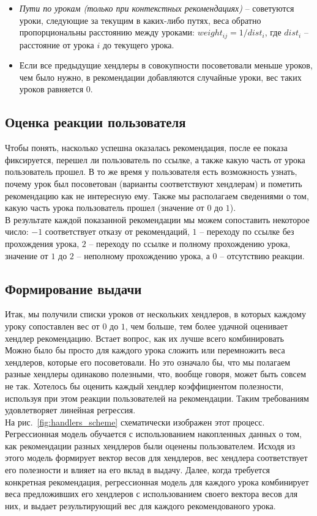 \documentclass[12pt]{article}
\begin{document}
\begin{itemize}
    \item \textit{Пути по урокам (только при контекстных рекомендациях)} -- советуются уроки, следующие за текущим в каких-либо путях, веса обратно пропорциональны расстоянию между уроками: $weight_{ij} = 1 / dist_{i}$, где $dist_i$ -- расстояние от урока $i$ до текущего урока.
    \item Если все предыдущие хендлеры в совокупности посоветовали меньше уроков, чем было нужно, в рекомендации добавляются случайные уроки, вес таких уроков равняется $0$.
\end{itemize}


\subsection{Оценка реакции пользователя}
\indent Чтобы понять, насколько успешна оказалась рекомендация, после ее показа фиксируется, перешел ли пользователь по ссылке, а также какую часть от урока пользователь прошел. В то же время у пользователя есть возможность узнать, почему урок был посоветован (варианты соответствуют хендлерам) и пометить рекомендацию как не интересную ему. Также мы располагаем сведениями о том, какую часть урока пользователь прошел (значение от $0$ до $1$).
\\\indent В результате каждой показанной рекомендации мы можем сопоставить некоторое число: $-1$ соответствует отказу от рекомендаций, $1$ -- переходу по ссылке без прохождения урока, $2$ -- переходу по ссылке и полному прохождению урока, значение от $1$ до $2$ -- неполному прохождению урока, а $0$ -- отсутствию реакции.


\subsection{Формирование выдачи}
\indent Итак, мы получили списки уроков от нескольких хендлеров, в которых каждому уроку сопоставлен вес от $0$ до $1$, чем больше, тем более удачной оценивает хендлер рекомендацию. Встает вопрос, как их лучше всего комбинировать
\\\indent Можно было бы просто для каждого урока сложить или перемножить веса хендлеров, которые его посоветовали. Но это означало бы, что мы полагаем разные хендлеры одинаково полезными, что, вообще говоря, может быть совсем не так. Хотелось бы оценить каждый хендлер коэффициентом полезности, используя при этом реакции пользователей на рекомендации. Таким требованиям удовлетворяет линейная регрессия.
\\\indent На рис.~\ref{fig:handlers_scheme} схематически изображен этот процесс. Регрессионная модель обучается с использованием накопленных данных о том, как рекомендации разных хендлеров были оценены пользователем. Исходя из этого модель формирует вектор весов для хендлеров, вес хендлера соответствует его полезности и влияет на его вклад в выдачу. Далее, когда требуется конкретная рекомендация, регрессионная модель для каждого урока комбинирует веса предложивших его хендлеров с использованием своего вектора весов для них, и выдает результирующий вес для каждого рекомендованого урока.
\end{document}
